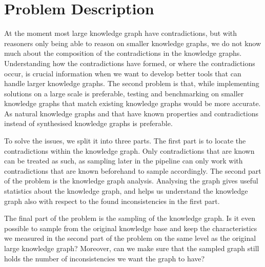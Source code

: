 \documentclass[11pt,letterpaper ,oneside ]{book}
\begin{document}
\section{Problem Description}
At the moment most large knowledge graph have contradictions, but with reasoners only being able to reason on smaller knowledge graphs, we do not know much about the composition of the contradictions in the knowledge graphs. Understanding how the contradictions have formed, or where the contradictions occur, is crucial information when we want to develop better tools that can handle larger knowledge graphs. The second problem is that, while implementing solutions on a large scale is preferable, testing and benchmarking on smaller knowledge graphs that match existing knowledge graphs would be more accurate. As natural knowledge graphs and that have known properties and contradictions instead of synthesised knowledge graphs is preferable. 

To solve the issues, we split it into three parts. The first part is to locate the contradictions within the knowledge graph. Only contradictions that are known can be treated as such, as sampling later in the pipeline can only work with contradictions that are known beforehand to sample accordingly.
The second part of the problem is the knowledge graph analysis. Analysing the graph gives useful statistics about the knowledge graph, and helps us understand the knowledge graph also with respect to the found inconsistencies in the first part.

The final part of the problem is the sampling of the knowledge graph. Is it even possible to sample from the original knowledge base and keep the characteristics we measured in the second part of the problem on the same level as the original large knowledge graph? Moreover, can we make sure that the sampled graph still holds the number of inconsistencies we want the graph to have? 
\end{document}

